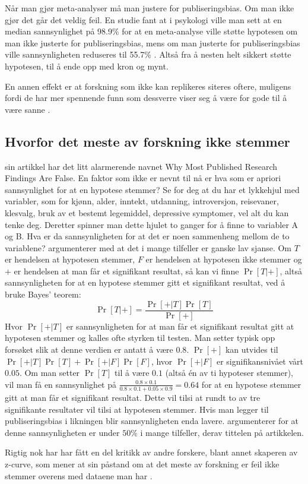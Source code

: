 \documentclass[doc,norsk]{apa7}
\begin{document}
Når man gjør meta-analyser må man justere for publiseringsbias. Om man ikke gjør det går det veldig feil. En studie fant at i psykologi ville man sett at en median sannsynlighet på 98.9\% for at en meta-analyse ville støtte hypotesen om man ikke justerte for publiseringsbias, mens om man justerte for publiseringsbias ville sannsynligheten reduseres til 55.7\% \parencite{publiseringsbias-psykologi}. Altså fra å nesten helt sikkert støtte hypotesen, til å ende opp med kron og mynt.

En annen effekt er at forskning som ikke kan replikeres siteres oftere, muligens fordi de har mer spennende funn som dessverre viser seg å være for gode til å være sanne \parencite{falsk-sitert-mer}.

\subsection{Hvorfor det meste av forskning ikke stemmer}
\textcite{forskning-fake} sin artikkel har det litt alarmerende navnet \guillemetleft Why Most Published Research Findings Are False\guillemetright. En faktor som ikke er nevnt til nå er hva som er apriori sannsynlighet for at en hypotese stemmer? Se for deg at du har et lykkehjul med variabler, som for kjønn, alder, inntekt, utdanning, introversjon, reisevaner, klesvalg, bruk av et bestemt legemiddel, depressive symptomer, vel alt du kan tenke deg. Deretter spinner man dette hjulet to ganger for å finne to variabler A og B. Hva er da sannsynligheten for at det er noen sammenheng mellom de to variablene? \textcite{forskning-fake} argumenterer med at det i mange tilfeller er ganske lav sjanse.
Om $T$ er hendelsen at hypotesen stemmer, $F$ er hendelsen at hypotesen ikke stemmer og $+$ er hendelsen at man får et signifikant resultat, så kan vi finne $\Pr[T|+]$, altså sannsynligheten for at en hypotese stemmer gitt et signifikant resultat, ved å bruke Bayes' teorem:
\begin{equation*}
\Pr[T|+] = \frac{\Pr[+|T]\Pr[T]}{\Pr[+]}
\end{equation*}
Hvor $\Pr[+|T]$ er sannsynligheten for at man får et signifikant resultat gitt at hypotesen stemmer og kalles ofte styrken til testen. Man setter typisk opp forsøket slik at denne verdien er antatt å være $0.8$. $\Pr[+]$ kan utvides til $\Pr[+|T]\Pr[T] + \Pr[+|F]\Pr[F]$, hvor $\Pr[+|F]$ er signifikansnivået vårt $0.05$. Om man setter $\Pr[T]$ til å være $0.1$ (altså én av ti hypoteser stemmer), vil man få en sannsynlighet på $\frac{0.8\times 0.1}{0.8\times 0.1 + 0.05\times 0.9} = 0.64$ for at en hypotese stemmer gitt at man får et signifikant resultat. Dette vil tilsi at rundt to av tre signifikante resultater vil tilsi at hypotesen stemmer. Hvis man legger til publiseringsbias i likningen blir sannsynligheten enda lavere. \textcite{forskning-fake} argumenterer for at denne sannsynligheten er under $50\%$ i mange tilfeller, derav tittelen på artikkelen.

Rigtig nok har \textcite{forskning-fake} har fått en del kritikk av andre forskere, blant annet skaperen av z-curve, som mener at \citeauthor{forskning-fake} sin påstand om at det meste av forskning er feil ikke stemmer overens med dataene man har \parencite{forskning-fake-kritikk}.

\printbibliography
\end{document}
